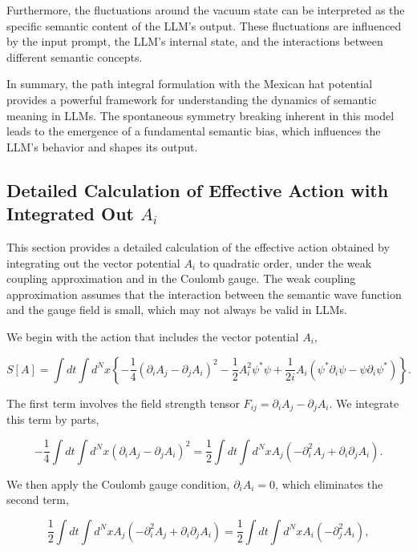 \documentclass[prd,amsmath,amssymb,12pt]{revtex4}
\begin{document}
Furthermore, the fluctuations around the vacuum state can be interpreted as the specific semantic
content of the LLM's output. These fluctuations are influenced by the input prompt, the LLM's internal state,
and the interactions between different semantic concepts.

In summary, the path integral formulation with the Mexican hat potential provides a powerful framework
for understanding the dynamics of semantic meaning in LLMs. The spontaneous symmetry breaking inherent
in this model leads to the emergence of a fundamental semantic bias, which influences the LLM's behavior and shapes
its output.


\subsection{Detailed Calculation of Effective Action with Integrated Out $A_i$}

This section provides a detailed calculation of the effective action obtained by integrating out the vector
potential $A_i$ to quadratic order, under the weak coupling approximation and in the Coulomb gauge.
The weak coupling approximation assumes that the interaction between the semantic wave function and the
gauge field is small, which may not always be valid in LLMs.

We begin with the action that includes the vector potential $A_i$,

\begin{equation}
    S[A] = \int dt \int d^{N}x \left\{ -\frac{1}{4}  (\partial_i A_j - \partial_j A_i)^2
    - \frac{1}{2}  A_i^2 \psi^* \psi  + \frac{1}{2i}  A_i (\psi^* \partial_i \psi - \psi \partial_i \psi^*) \right\}.
\end{equation}

\noindent
The first term involves the field strength tensor $F_{ij} = \partial_i A_j - \partial_j A_i$.
We integrate this term by parts,

\begin{equation}
    -\frac{1}{4} \int dt \int d^{N}x  (\partial_i A_j - \partial_j A_i)^2
    = \frac{1}{2} \int dt \int d^{N}x  A_j (-\partial_i^2 A_j + \partial_i \partial_j A_i).
\end{equation}

\noindent
We then apply the Coulomb gauge condition, $\partial_i A_i = 0$, which eliminates the second term,

\begin{equation}
    \frac{1}{2} \int dt \int d^{N}x  A_j (-\partial_i^2 A_j + \partial_i \partial_j A_i)
    = \frac{1}{2} \int dt \int d^{N}x  A_i (-\partial_j^2 A_i),
\end{equation}
\end{document}
